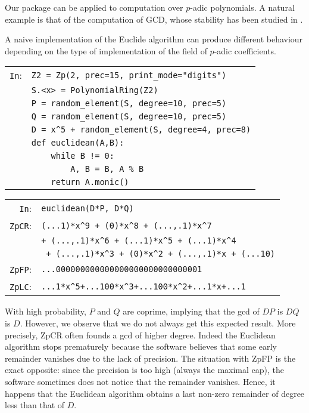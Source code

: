 \documentclass[sigconf]{acmart}
\newcommand{\cIn}{{\color{blue} \tt \phantom{Zp}In}:}
\newcommand{\cZpCR}{{\color{red} \tt ZpCR}:}
\newcommand{\cZpFP}{{\color{red} \tt ZpFP}:}
\newcommand{\cZpLC}{{\color{red} \tt ZpLC}:}
\theoremstyle{definition}
\begin{document}
Our package can be applied to
computation over $p$-adic polynomials.
A natural example is that of the computation of GCD,
whose stability has been studied in \cite{caruso-2017}.

A naive implementation of the Euclide algorithm
can produce different behaviour depending 
on the type of implementation of the field
of $p$-adic coefficients.

\begin{tabular}{rl}
\cIn
 & \verb?Z2 = Zp(2, prec=15, print_mode="digits")? \\
  & \verb?S.<x> = PolynomialRing(Z2)? \\
 & \verb?P = random_element(S, degree=10, prec=5)? \\
 & \verb?Q = random_element(S, degree=10, prec=5)? \\
 & \verb?D = x^5 + random_element(S, degree=4, prec=8)? \\
 & \verb?def euclidean(A,B):? \\
 & \verb?    while B != 0:? \\
 & \verb?        A, B = B, A % B? \\
 & \verb?    return A.monic()? \\
\end{tabular}

\bigskip

\begin{tabular}{rl}
\cIn
  & \verb?euclidean(D*P, D*Q)? \\
\cZpCR
 & \verb?(...1)*x^9 + (0)*x^8 + (...,.1)*x^7 ?\\
 & \verb?+ (...,.1)*x^6 + (...1)*x^5 + (...1)*x^4?\\
 & \verb? + (...,.1)*x^3 + (0)*x^2 + (...,.1)*x + (...10)? \\
\cZpFP
 & \verb?...000000000000000000000000000001? \\
\cZpLC
 & \verb?...1*x^5+...100*x^3+...100*x^2+...1*x+...1? \\
\end{tabular}


With high probability, $P$ and $Q$ are coprime, implying that the gcd of $DP$ is $DQ$ is $D$.  
However, we observe that we do not always get this expected result.
More precisely, ZpCR often founds a gcd of higher degree.
Indeed the Euclidean algorithm stops prematurely because the software believes that some early remainder vanishes due to the lack of precision.  
The situation with ZpFP is the exact opposite:
since the precision is too high (always the maximal cap), 
the software sometimes does not notice that the remainder vanishes.
Hence, it happens that the Euclidean algorithm 
obtains a last non-zero remainder of degree less than that of
$D.$
\end{document}
